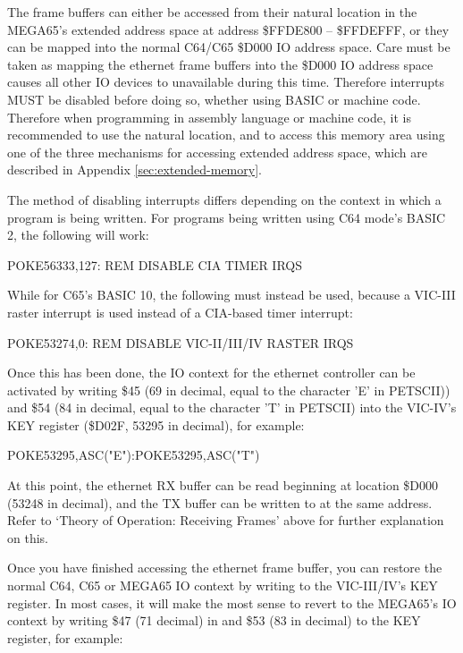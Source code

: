 The frame buffers can either be accessed from their natural location in the MEGA65's extended address space at address
\$FFDE800 -- \$FFDEFFF, or they can be mapped into the normal C64/C65 \$D000 IO address space.  Care must be
taken as mapping the ethernet frame buffers into the \$D000 IO address space causes all other IO devices to unavailable
during this time.  Therefore interrupts MUST be disabled before doing so, whether using BASIC or machine code.  Therefore
when programming in assembly language or machine code, it is recommended to use the natural location, and to access this
memory area using one of the three mechanisms for accessing extended address space, which are described in Appendix
\ref{sec:extended-memory}.

The method of
disabling interrupts differs depending on the context in which a program is being written. For programs being written using C64 mode's BASIC 2, the following will work:

\begin{screenoutput}
  POKE56333,127: REM DISABLE CIA TIMER IRQS
\end{screenoutput}

While for C65's BASIC 10, the following must instead be used, because a VIC-III raster interrupt is used instead of a CIA-based timer interrupt:

\begin{screenoutput}
POKE53274,0: REM DISABLE VIC-II/III/IV RASTER IRQS
\end{screenoutput}

Once this has been done, the IO context for the ethernet controller can be activated by writing \$45 (69 in decimal, equal to the character 'E' in PETSCII)) and \$54 (84 in decimal, equal to the character 'T' in PETSCII) into the VIC-IV's KEY register (\$D02F, 53295 in decimal), for example:

\begin{screenoutput}
POKE53295,ASC("E"):POKE53295,ASC("T")
\end{screenoutput}

At this point, the ethernet RX buffer can be read beginning at location \$D000 (53248 in decimal), and the TX buffer can be written to at the same address.  Refer to `Theory of Operation: Receiving Frames' above for further explanation on this.

Once you have finished accessing the ethernet frame buffer, you can restore the normal C64, C65 or MEGA65 IO context by writing to the VIC-III/IV's KEY register.  In most cases, it will make the most sense to revert to the MEGA65's IO context by writing \$47 (71 decimal) in and \$53 (83 in decimal) to the KEY register, for example:

